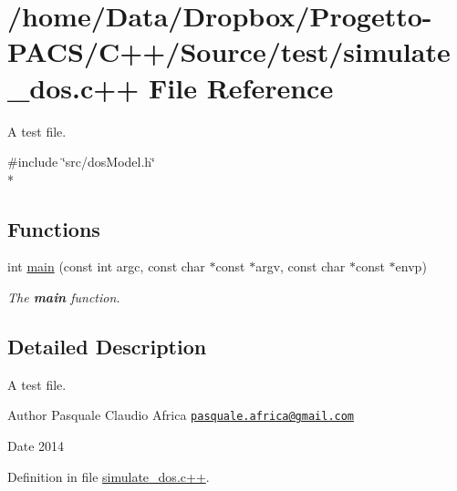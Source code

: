 \hypertarget{simulate__dos_8c_09_09}{\section{/home/\-Data/\-Dropbox/\-Progetto-\/\-P\-A\-C\-S/\-C++/\-Source/test/simulate\-\_\-dos.c++ File Reference}
\label{simulate__dos_8c_09_09}
}


A test file.  


{\ttfamily \#include \char`\"{}src/dos\-Model.\-h\char`\"{}}\\*
\subsection*{Functions}
\begin{DoxyCompactItemize}
\item 
\hypertarget{simulate__dos_8c_09_09_abb42499d73e7c21855b75ac125b8da84}{int \hyperlink{simulate__dos_8c_09_09_abb42499d73e7c21855b75ac125b8da84}{main} (const int argc, const char $\ast$const $\ast$argv, const char $\ast$const $\ast$envp)}\label{simulate__dos_8c_09_09_abb42499d73e7c21855b75ac125b8da84}

\begin{DoxyCompactList}\small\item\em The {\bfseries main} function. \end{DoxyCompactList}\end{DoxyCompactItemize}


\subsection{Detailed Description}
A test file. \begin{DoxyAuthor}{Author}
Pasquale Claudio Africa \href{mailto:pasquale.africa@gmail.com}{\tt pasquale.\-africa@gmail.\-com} 
\end{DoxyAuthor}
\begin{DoxyDate}{Date}
2014 
\end{DoxyDate}


Definition in file \hyperlink{simulate__dos_8c_09_09_source}{simulate\-\_\-dos.\-c++}.

